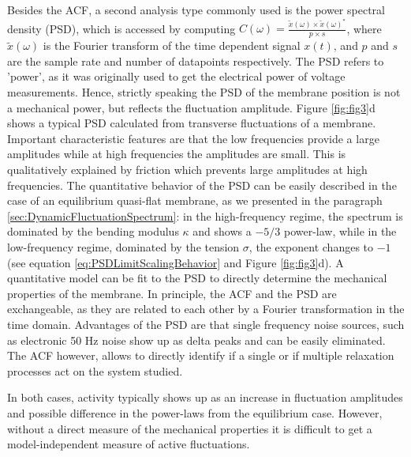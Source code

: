 \documentclass[graybox]{svmult}
\begin{document}
Besides the ACF, a second analysis type commonly used is the power spectral density (PSD), which is accessed by computing $C(\omega)=\frac{\tilde{x}(\omega)\times \tilde{x}(\omega)^*}{p \times s}$, where $\tilde{x}(\omega)$ is the Fourier transform of the time dependent signal $x(t)$, and $p$ and $s$ are the sample rate and number of datapoints respectively. The PSD refers to 'power', as it was originally used to get the electrical power of voltage measurements. Hence, strictly speaking the PSD of the membrane position is not a mechanical power, but reflects the fluctuation amplitude. Figure \ref{fig:fig3}d shows a typical PSD calculated from transverse fluctuations of a membrane. Important characteristic features are that the low frequencies provide a large amplitudes while at high frequencies the amplitudes are small. This is qualitatively explained by friction which prevents large amplitudes at high frequencies. The quantitative behavior of the PSD can be easily described in the case of an equilibrium quasi-flat membrane, as we presented in the paragraph \ref{sec:DynamicFluctuationSpectrum}: in the high-frequency regime, the spectrum is dominated by the bending modulus $\kappa$ and shows a $-5/3$ power-law, while in the low-frequency regime, dominated by the tension $\sigma$, the exponent changes to $-1$ (see equation \eqref{eq:PSDLimitScalingBehavior} and Figure \ref{fig:fig3}d). A quantitative model can be fit to the PSD to directly determine the mechanical properties of the membrane. In principle, the ACF and the PSD are exchangeable, as they are related to each other by a Fourier transformation in the time domain.  Advantages of the PSD are that single frequency noise sources, such as electronic 50 Hz noise show up as delta peaks and can be easily eliminated. The ACF however, allows to directly identify if a single or if multiple relaxation processes act on the system studied.  

In both cases, activity typically shows up as an increase in fluctuation amplitudes and possible difference in the power-laws from the equilibrium case. However, without a direct measure of the mechanical properties it is difficult to get a model-independent measure of active fluctuations.
\end{document}
